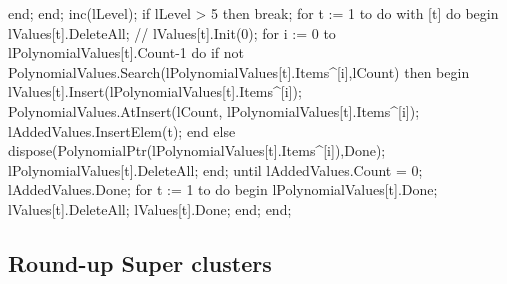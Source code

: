                   end;
      end;
      inc(lLevel);
      if lLevel > 5 then break;
      for t := 1 to  do
         with [t] do
      begin
         lValues[t].DeleteAll;
         //    lValues[t].Init(0);
         for i := 0 to lPolynomialValues[t].Count-1 do
            if not PolynomialValues.Search(lPolynomialValues[t].Items^[i],lCount) then
            begin
               lValues[t].Insert(lPolynomialValues[t].Items^[i]);
               PolynomialValues.AtInsert(lCount, lPolynomialValues[t].Items^[i]);
               lAddedValues.InsertElem(t);
            end
            else dispose(PolynomialPtr(lPolynomialValues[t].Items^[i]),Done);
         lPolynomialValues[t].DeleteAll;
      end;
   until lAddedValues.Count = 0;
   lAddedValues.Done;
   for t := 1 to  do
   begin
      lPolynomialValues[t].Done;
      lValues[t].DeleteAll;
      lValues[t].Done;
   end;
end;
\eatline
{}\nwendcode{}\nwdocspar
\subsection{Round-up Super clusters}

